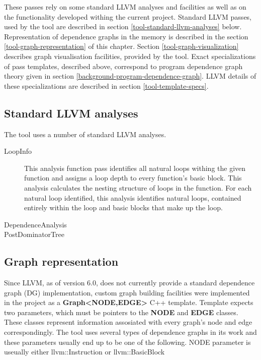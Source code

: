 \quad These passes rely on some standard LLVM analyses and facilities as well as on the functionality developed withing the current project. Standard LLVM passes, used by the tool are described in section \ref{tool-standard-llvm-analyses} below. Representation of dependence graphs in the memory is described in the section \ref{tool-graph-representation} of this chapter. Section \ref{tool-graph-visualization} describes graph visualisation facilities, provided by the tool. Exact specializations of pass templates, described above, correspond to program dependence graph theory given in section \ref{background-program-dependence-graph}. LLVM details of these specializations are described in section \ref{tool-template-specs}.  

\subsection{Standard LLVM analyses} \label{ppar-tool-standard-llvm-analyses}
\qquad The tool uses a number of standard LLVM analyses.

\begin{description}
	
	\item [LoopInfo] This analysis function pass identifies all natural loops withing the given function and assigns a loop depth to every function's basic block. This analysis calculates the nesting structure of loops in the function. For each natural loop identified, this analysis identifies natural loops, contained entirely within the loop and basic blocks that make up the loop.   
	
	\item [DependenceAnalysis] 
	
	\item [PostDominatorTree]
	
\end{description} 

\subsection{Graph representation} \label{ppar-tool-graph-representation}
\qquad Since LLVM, as of version 6.0, does not currently provide a standard dependence graph (DG) implementation, custom graph building facilities were implemented in the project as a \textbf{Graph\textless \textsc{NODE},\textsc{EDGE}\textgreater} C++ template. Template expects two parameters, which must be pointers to the \textbf{NODE} and \textbf{EDGE} classes. These classes represent information assosiated with every graph's node and edge correspondingly. The tool uses several types of dependence graphs in its work and these parameters usually end up to be one of the following. NODE parameter is useually either llvm::Instruction or llvm::BasicBlock   

